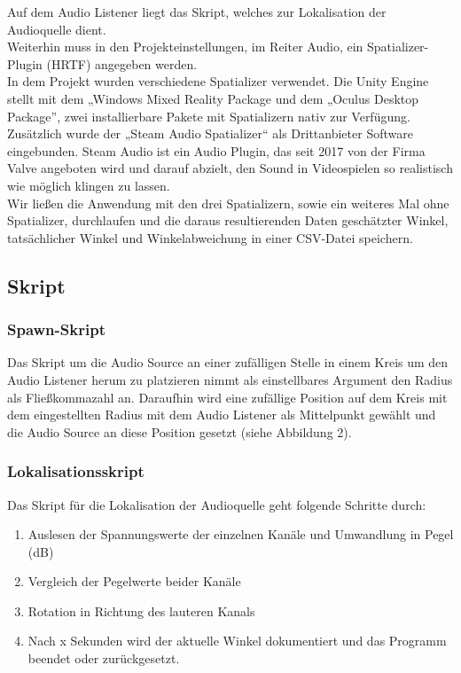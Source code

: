 \documentclass[12pt,a4paper]{article}
\begin{document}
Auf dem Audio Listener liegt das Skript, welches zur Lokalisation der Audioquelle dient.\\
Weiterhin muss in den Projekteinstellungen, im Reiter Audio, ein Spatializer-Plugin (HRTF) angegeben werden.\\
In dem Projekt wurden verschiedene Spatializer verwendet. Die Unity Engine stellt mit dem „Windows Mixed Reality Package und dem „Oculus Desktop Package”, zwei installierbare Pakete mit Spatializern nativ zur Verfügung. Zusätzlich wurde der „Steam Audio Spatializer“ als Drittanbieter Software eingebunden. Steam Audio ist ein Audio Plugin, das seit 2017 von der Firma Valve angeboten wird und darauf abzielt, den Sound in Videospielen so realistisch wie möglich klingen zu lassen.\\

Wir ließen die Anwendung mit den drei Spatializern, sowie ein weiteres Mal ohne Spatializer, durchlaufen und die daraus resultierenden Daten geschätzter Winkel, tatsächlicher Winkel und Winkelabweichung in einer CSV-Datei speichern.

\subsection{Skript}

\subsubsection{Spawn-Skript}
Das Skript um die Audio Source an einer zufälligen Stelle in einem Kreis um den Audio Listener herum zu platzieren nimmt als einstellbares Argument den Radius als Fließkommazahl an. Daraufhin wird eine zufällige Position auf dem Kreis mit dem eingestellten Radius mit dem Audio Listener als Mittelpunkt gewählt und die Audio Source an diese Position gesetzt (siehe Abbildung 2).\\
\newpage
\subsubsection{Lokalisationsskript}
Das Skript für die Lokalisation der Audioquelle geht folgende Schritte durch:
\begin{enumerate}
\item Auslesen der Spannungswerte der einzelnen Kanäle und Umwandlung in Pegel (dB)
\item Vergleich der Pegelwerte beider Kanäle
\item Rotation in Richtung des lauteren Kanals
\item Nach x Sekunden wird der aktuelle Winkel dokumentiert und das Programm beendet oder zurückgesetzt.
\end{enumerate}
\end{document}
